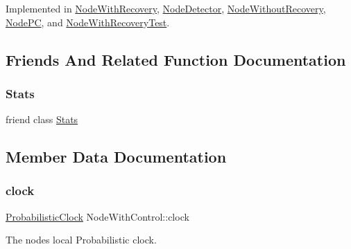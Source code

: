 Implemented in \hyperlink{class_node_with_recovery_aec147b3723b3dab00f9610453ba8daba}{Node\+With\+Recovery}, \hyperlink{class_node_detector_a51e7dccd54e94bbe937752ca39dfdba4}{Node\+Detector}, \hyperlink{class_node_without_recovery_a8cf83ec6d0af26e385dcde0bc03f5b6d}{Node\+Without\+Recovery}, \hyperlink{class_node_p_c_a54731196935596e0c6f094a5a8420134}{Node\+PC}, and \hyperlink{class_node_with_recovery_test_af9b78d0ed4fefb97e2f54c9279aa4655}{Node\+With\+Recovery\+Test}.



\subsection{Friends And Related Function Documentation}
\mbox{\label{class_node_with_control_a129f65b6976377739eb6231b6962985e}} 
\subsubsection{\texorpdfstring{Stats}{Stats}}
{\footnotesize\ttfamily friend class \hyperlink{class_stats}{Stats}\hspace{0.3cm}{\ttfamily [friend]}}



\subsection{Member Data Documentation}
\mbox{\label{class_node_with_control_a051a7d7f2452f1f8da3bc5bfb05a7760}} 
\subsubsection{\texorpdfstring{clock}{clock}}
{\footnotesize\ttfamily \hyperlink{class_probabilistic_clock}{Probabilistic\+Clock} Node\+With\+Control\+::clock\hspace{0.3cm}{\ttfamily [protected]}}



The node\textquotesingle{}s local Probabilistic clock. 

\mbox{\label{class_node_with_control_aed34cc5a5b277c43f10f8cbbbeb59327}} 
